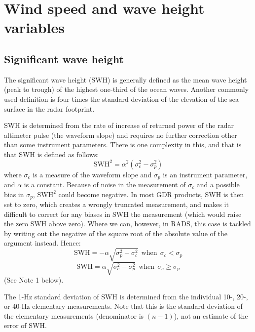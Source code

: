 \documentclass[a4paper,11pt,openany,natbib]{thesis}
\begin{document}
\chapter{Wind speed and wave height variables}
\section{Significant wave height}
\label{var:swh}
The significant wave height (SWH) is generally defined as the mean wave height (peak to trough) of the highest one-third of the ocean waves. Another commonly used definition is four times the standard deviation of the elevation of the sea surface in the radar footprint.

SWH is determined from the rate of increase of returned power of the radar altimeter pulse (the waveform slope) and requires no further correction other than some instrument parameters. There is one complexity in this, and that is that SWH is defined as follows:
$$ \mathrm{SWH}^2 = \alpha^2 (\sigma_c^2 - \sigma_p^2) $$
where $\sigma_c$ is a measure of the waveform slope and $\sigma_p$ is an instrument parameter, and $\alpha$ is a constant. Because of noise in the measurement of $\sigma_c$ and a possible bias in $\sigma_p$, $\mathrm{SWH}^2$ could become negative. In most GDR products, SWH is then set to zero, which creates a wrongly truncated measurement, and makes it difficult to correct for any biases in SWH the measurement (which would raise the zero SWH above zero). Where we can, however, in RADS, this case is tackled by writing out the negative of the square root of the absolute value of the argument instead. Hence:
$$ \mathrm{SWH} = - \alpha \sqrt{\sigma_p^2 - \sigma_c^2} \mathrm{~~when~~} \sigma_c < \sigma_p $$
$$ \mathrm{SWH} = \alpha \sqrt{\sigma_c^2 - \sigma_p^2} \mathrm{~~when~~} \sigma_c \ge \sigma_p $$
(See Note 1 below).

The 1-Hz standard deviation of SWH is determined from the individual 10-, 20-, or 40-Hz elementary measurements. Note that this is the standard deviation of the elementary measurements (denominator is $(n-1)$), not an estimate of the error of SWH.
\end{document}
